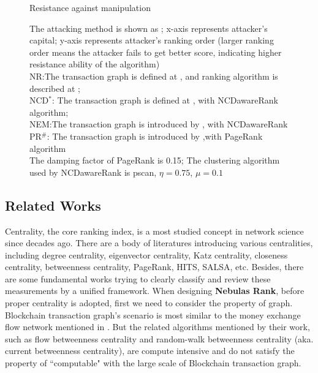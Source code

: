 \begin{figure}[htbp]
	\caption{Resistance against manipulation} \label{fig:antiManipulation}
	\caption*{\footnotesize{The attacking method is shown as ; x-axis represents attacker's capital; y-axis represents attacker's ranking order (larger ranking order means the attacker fails to get better score, indicating higher resistance ability of the algorithm)  \\
	NR:The transaction graph is defined at , and ranking algorithm is described at ; \\
	NCD$^*$: The transaction graph is defined at , with NCDawareRank algorithm; \\
	NEM:The transaction graph is introduced by \cite{nem}, with NCDawareRank\\
	PR$^{\#}$: The transaction graph is introduced by \cite{nem},with PageRank algorithm\\
	The damping factor of PageRank is 0.15; The clustering algorithm used by NCDawareRank is pscan\cite{chang2017mathsf}, $\eta=0.75$, $\mu=0.1$}}
\end{figure}

\subsection{Related Works} \label{subsec:related}

Centrality, the core ranking index, is a most studied concept in network science since decades ago\cite{newman2010networks}. There are a body of literatures introducing various centralities, including degree centrality\cite{freeman1979set}, eigenvector centrality\cite{bonacich1972factoring}, Katz centrality\cite{katz1953new}, closeness centrality\cite{sabidussi1966centrality}, betweenness centrality\cite{freeman1977set}\cite{freeman1978centrality}\cite{freeman1991centrality}\cite{noh2004random}\cite{newman2005measure}, PageRank\cite{Brin2010}, HITS\cite{kleinberg1999authoritative}, SALSA\cite{Science2001}, etc. Besides, there are some fundamental works trying to clearly classify and review these measurements by a unified framework\cite{Borgatti2005}\cite{Borgatti2006}\cite{Lu2016}. When designing \textbf{Nebulas Rank}, before proper centrality is adopted, first we need to consider the property of graph. Blockchain transaction graph's scenario is most similar to the money exchange flow network mentioned in \cite{Borgatti2005}. But the related algorithms mentioned by their work, such as flow betweenness centrality\cite{freeman1991centrality} and random-walk betweenness centrality (aka. current betweenness centrality)\cite{newman2005measure}, are compute intensive and do not satisfy the property of ``computable" with the large scale of Blockchain transaction graph.

